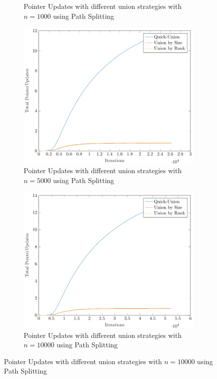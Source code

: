 \begin{figure}[ht]
\begin{subfigure}{0.32\textwidth}
        \caption{Pointer Updates with different union strategies with $n = 1000$ using Path Splitting}
    \end{subfigure}%
    \hfill
    \begin{subfigure}{0.32\textwidth}
        \centering
        \includegraphics[width=\textwidth]{../images/plotPSFull5000_PointerUpdates.pdf}
        \caption{Pointer Updates with different union strategies with $n = 5000$ using Path Splitting}
    \end{subfigure}%
    \hfill
    \begin{subfigure}{0.32\textwidth}
        \centering
        \includegraphics[width=\textwidth]{../images/plotPSFull10000_PointerUpdates.pdf}
        \caption{Pointer Updates with different union strategies with $n = 10000$ using Path Splitting}
    \end{subfigure}


\end{figure}
